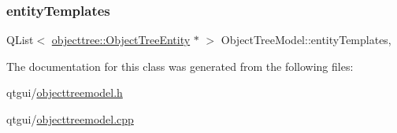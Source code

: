 \subsubsection{\texorpdfstring{entityTemplates}{entityTemplates}}
{\footnotesize\ttfamily Q\+List$<$ \mbox{\hyperlink{classobjecttree_1_1_object_tree_entity}{objecttree\+::\+Object\+Tree\+Entity}} $\ast$ $>$ Object\+Tree\+Model\+::entity\+Templates\hspace{0.3cm}{\ttfamily [static]}, {\ttfamily [protected]}}



The documentation for this class was generated from the following files\+:\begin{DoxyCompactItemize}
\item 
qtgui/\mbox{\hyperlink{objecttreemodel_8h}{objecttreemodel.\+h}}\item 
qtgui/\mbox{\hyperlink{objecttreemodel_8cpp}{objecttreemodel.\+cpp}}\end{DoxyCompactItemize}

